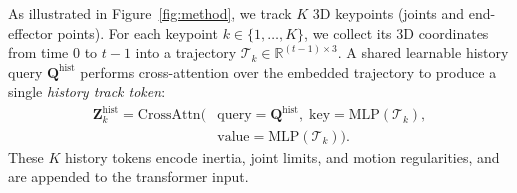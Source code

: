 
As illustrated in Figure~\ref{fig:method}, we track $K$ 3D keypoints (joints and end-effector points). For each keypoint $k\in\{1,\ldots,K\}$, we collect its 3D coordinates from time $0$ to $t{-}1$ into a trajectory $\bm{\mathcal{T}}_k \in \mathbb{R}^{(t-1)\times 3}$. A shared learnable history query $\mathbf{Q}^{\text{hist}}$ performs cross-attention over the embedded trajectory to produce a single \textit{history track token}:
\vspace{-10pt}
\begin{equation}
\begin{aligned}
\mathbf{Z}_k^{\text{hist}}
= \text{CrossAttn}\big(&\text{query}=\mathbf{Q}^{\text{hist}},\;
\text{key}=\text{MLP}(\bm{\mathcal{T}}_k),\\
&\text{value}=\text{MLP}(\bm{\mathcal{T}}_k)\big).
\end{aligned}
\end{equation}
These $K$ history tokens encode inertia, joint limits, and motion regularities, and are appended to the transformer input.


